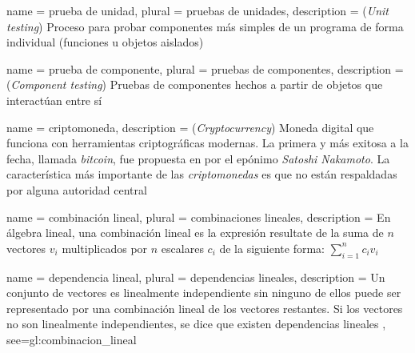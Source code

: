 {
  name = prueba de unidad,
  plural = pruebas de unidades,
  description = {
    (\textit{Unit testing}) Proceso para probar componentes más simples de un
    programa de forma individual (funciones u objetos aislados)
    \cite{DBLP:books/lib/Sommerville07}%
  }
}

{
  name = prueba de componente,
  plural = pruebas de componentes,
  description = {
    (\textit{Component testing}) Pruebas de componentes hechos a partir de
    objetos que interactúan entre sí
    \cite{DBLP:books/lib/Sommerville07}%
  }
}

{
  name = criptomoneda,
  description = {
    (\textit{Cryptocurrency}) Moneda digital que funciona con herramientas
    criptográficas modernas. La primera y más exitosa a la fecha, llamada
    \textit{bitcoin}, fue propuesta en \cite{bitcoin} por el epónimo
    \textit{Satoshi Nakamoto}. La característica más importante de las
    \textit{criptomonedas} es que no están respaldadas por alguna autoridad
    central \cite{DBLP:journals/iacr/BhattacherjeeS17}%
  }
}

{
  name = combinación lineal,
  plural = combinaciones lineales,
  description = {
    En álgebra lineal, una combinación lineal es la expresión resultate
    de la suma de $n$ vectores $v_i$ multiplicados por $n$ escalares $c_i$
    de la siguiente forma: $\sum_{i=1}^{n}c_i v_i$%
  }
}

{
  name = dependencia lineal,
  plural = dependencias lineales,
  description = {
    Un conjunto de vectores es linealmente independiente sin ninguno de
    ellos puede ser representado por una combinación lineal de los vectores
    restantes.
    Si los vectores no son linealmente independientes, se dice que existen
    dependencias lineales%
  },
  see={gl:combinacion_lineal}
}

\glsaddall
